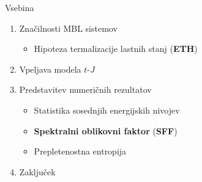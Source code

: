 \documentclass[1pt]{beamer}
\begin{document}
\begin{frame}{Vsebina}
\begin{enumerate}
	\item Značilnosti MBL sistemov\vspace{2.5mm}
	\begin{itemize}
		\item Hipoteza termalizacije lastnih stanj (\textbf{ETH})\vspace{5mm}
	\end{itemize}
	\item Vpeljava modela $t$-$J$\vspace{5mm}

	\item Predstavitev numeričnih rezultatov\vspace{2.5mm}
	\begin{itemize}
		\item Statistika sosednjih energijskih nivojev
		\item \textbf{Spektralni oblikovni faktor} (\textbf{SFF})
		\item Prepletenostna entropija 
		\vspace{5mm}
	\end{itemize}
	\item Zaključek
\end{enumerate}
\end{frame}
\end{document}
